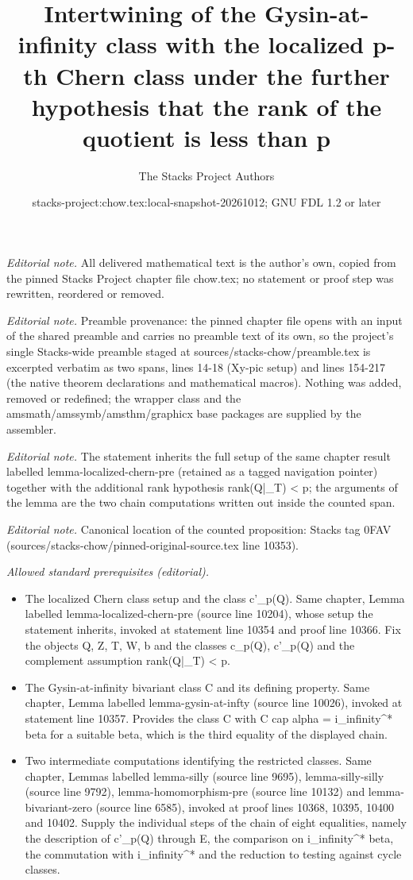 \documentclass[10pt,a4paper]{amsart}
\title{Intertwining of the Gysin-at-infinity class with the localized p-th Chern class under the further hypothesis that the rank of the quotient is less than p}
\author{The Stacks Project Authors}
\date{stacks-project:chow.tex:local-snapshot-20261012; GNU FDL 1.2 or later}
\theoremstyle{plain}
\theoremstyle{definition}
\theoremstyle{remark}
\numberwithin{equation}{subsection}
\begin{document}
\maketitle
\noindent\textit{Editorial note.} All delivered mathematical text is the author's own, copied from the pinned Stacks Project chapter file chow.tex; no statement or proof step was rewritten, reordered or removed.\par\medskip
\noindent\textit{Editorial note.} Preamble provenance: the pinned chapter file opens with an input of the shared preamble and carries no preamble text of its own, so the project's single Stacks-wide preamble staged at sources/stacks-chow/preamble.tex is excerpted verbatim as two spans, lines 14-18 (Xy-pic setup) and lines 154-217 (the native theorem declarations and mathematical macros). Nothing was added, removed or redefined; the wrapper class and the amsmath/amssymb/amsthm/graphicx base packages are supplied by the assembler.\par\medskip
\noindent\textit{Editorial note.} The statement inherits the full setup of the same chapter result labelled lemma-localized-chern-pre (retained as a tagged navigation pointer) together with the additional rank hypothesis rank(Q|\_T) < p; the arguments of the lemma are the two chain computations written out inside the counted span.\par\medskip
\noindent\textit{Editorial note.} Canonical location of the counted proposition: Stacks tag 0FAV (sources/stacks-chow/pinned-original-source.tex line 10353).\par\medskip
\noindent\textit{Allowed standard prerequisites (editorial).}\begin{itemize}
\item The localized Chern class setup and the class c'\_p(Q). Same chapter, Lemma labelled lemma-localized-chern-pre (source line 10204), whose setup the statement inherits, invoked at statement line 10354 and proof line 10366. Fix the objects Q, Z, T, W, b and the classes c\_p(Q), c'\_p(Q) and the complement assumption rank(Q|\_T) < p.
\item The Gysin-at-infinity bivariant class C and its defining property. Same chapter, Lemma labelled lemma-gysin-at-infty (source line 10026), invoked at statement line 10357. Provides the class C with C cap alpha = i\_infinity\textasciicircum{}* beta for a suitable beta, which is the third equality of the displayed chain.
\item Two intermediate computations identifying the restricted classes. Same chapter, Lemmas labelled lemma-silly (source line 9695), lemma-silly-silly (source line 9792), lemma-homomorphism-pre (source line 10132) and lemma-bivariant-zero (source line 6585), invoked at proof lines 10368, 10395, 10400 and 10402. Supply the individual steps of the chain of eight equalities, namely the description of c'\_p(Q) through E, the comparison on i\_infinity\textasciicircum{}* beta, the commutation with i\_infinity\textasciicircum{}* and the reduction to testing against cycle classes.
\end{itemize}\medskip
\end{document}
